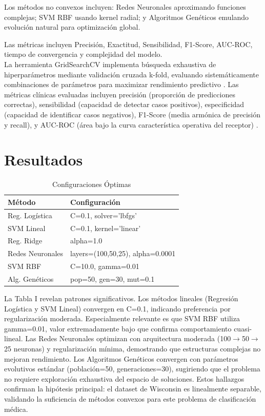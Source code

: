 \documentclass[conference]{IEEEtran}
\begin{document}
Los métodos no convexos \cite{nocedal2006} incluyen: Redes Neuronales \cite{goodfellow2016} aproximando funciones complejas; SVM RBF usando kernel radial; y Algoritmos Genéticos \cite{holland1992} emulando evolución natural para optimización global.

Las métricas incluyen Precisión, Exactitud, Sensibilidad, F1-Score, AUC-ROC, tiempo de convergencia y complejidad del modelo.\\ 
La herramienta GridSearchCV implementa búsqueda exhaustiva de hiperparámetros mediante validación cruzada k-fold, evaluando sistemáticamente combinaciones de parámetros para maximizar rendimiento predictivo \cite{bergstra2012}. Las métricas clínicas evaluadas incluyen precisión (proporción de predicciones correctas), sensibilidad (capacidad de detectar casos positivos), especificidad (capacidad de identificar casos negativos), F1-Score (media armónica de precisión y recall), y AUC-ROC (área bajo la curva característica operativa del receptor) \cite{fawcett2006}.
\section{Resultados}

\begin{table}[htbp]
\caption{Configuraciones Óptimas}
\begin{center}
\footnotesize
\begin{tabular}{|l|p{4.5cm}|}
\hline
\textbf{Método} & \textbf{Configuración} \\
\hline
Reg. Logística & C=0.1, solver='lbfgs' \\
\hline
SVM Lineal & C=0.1, kernel='linear' \\
\hline
Reg. Ridge & alpha=1.0 \\
\hline
Redes Neuronales & layers=(100,50,25), alpha=0.0001 \\
\hline
SVM RBF & C=10.0, gamma=0.01 \\
\hline
Alg. Genéticos & pop=50, gen=30, mut=0.1 \\
\hline
\end{tabular}
\label{tab1}
\end{center}
\end{table}

La Tabla I revelan patrones significativos. Los métodos lineales (Regresión Logística y SVM Lineal) convergen en C=0.1, indicando preferencia por regularización moderada. Especialmente relevante es que SVM RBF utiliza gamma=0.01, valor extremadamente bajo que confirma comportamiento cuasi-lineal. Las Redes Neuronales optimizan con arquitectura moderada (100$\rightarrow$50$\rightarrow$25 neuronas) y regularización mínima, demostrando que estructuras complejas no mejoran rendimiento. Los Algoritmos Genéticos convergen con parámetros evolutivos estándar (población=50, generaciones=30), sugiriendo que el problema no requiere exploración exhaustiva del espacio de soluciones. Estos hallazgos confirman la hipótesis principal: el dataset de Wisconsin es linealmente separable, validando la suficiencia de métodos convexos para este problema de clasificación médica.
\end{document}

